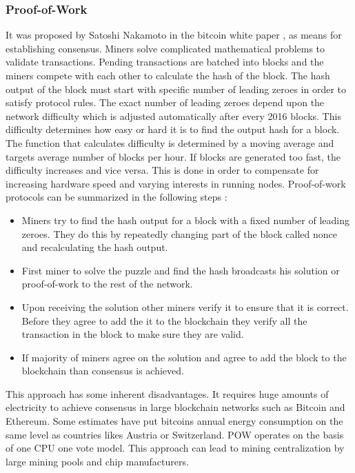 \subsubsection{Proof-of-Work} \label{PW}
It was proposed by Satoshi Nakamoto in the bitcoin white paper \cite{paper:001}, as means for establishing consensus. Miners solve complicated mathematical problems to validate transactions. Pending transactions are batched into blocks and the miners compete with each other to calculate the hash of the block. The hash output of the block must start with specific number of leading zeroes in order to satisfy protocol rules. The exact number of leading zeroes depend upon the network difficulty which is adjusted automatically after every 2016 blocks. This difficulty determines how easy or hard it is to find the output hash for a block. The function that calculates difficulty is determined by a moving average and targets average number of blocks per hour. If blocks are generated too fast, the difficulty increases and vice versa. This is done in order to compensate for increasing hardware speed and varying interests in running nodes. Proof-of-work protocols can be summarized in the following steps \cite{medium:001}:

\begin{itemize}
  \item Miners try to find the hash output for a block with a fixed number of leading zeroes. They do this by repeatedly changing part of the block called nonce and recalculating the hash output.
  \item First miner to solve the puzzle and find the hash broadcasts his solution or proof-of-work to the rest of the network.
  \item Upon receiving the solution other miners verify it to ensure that it is correct. Before they agree to add the it to the blockchain they verify all the transaction in the block to make sure they are valid.
  \item If majority of miners agree on the solution and agree to add the block to the blockchain than consensus is achieved.
\end{itemize}
This approach has some inherent disadvantages. It requires huge amounts of electricity to achieve consensus in large blockchain networks such as Bitcoin and Ethereum. Some estimates have put bitcoins annual energy consumption on the same level as countries likes Austria or Switzerland. POW operates on the basis of one CPU one vote model. This approach can lead to mining centralization by large mining pools and chip manufacturers.
\vspace{0.5cm}  
